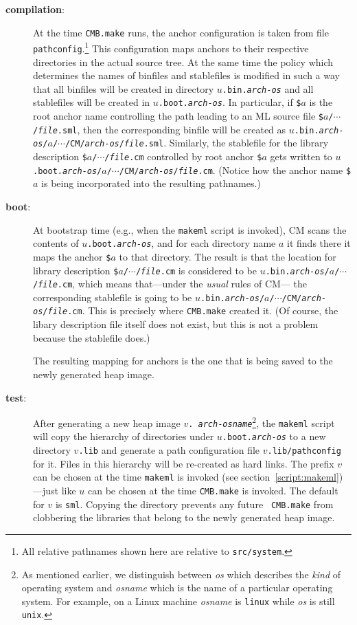\begin{description}
\item[{\bf compilation}:]
At the time {\tt CMB.make} runs, the anchor configuration is taken
from file {\tt pathconfig}.\footnote{All relative pathnames shown here
are relative to {\tt src/system}.}  This configuration maps anchors to
their respective directories in the actual source tree.  At the same
time the policy which determines the names of binfiles
and stablefiles is modified in such a way that all binfiles will be
created in directory {\tt $u$.bin.{\it arch}-{\it os}} and all
stablefiles will be created in {\tt $u$.boot.{\it arch}-{\it os}}.
In particular, if {\tt \$$a$} is the root anchor name controlling
the path leading to an ML source file
{\tt \$$a$/$\cdots$/{\it file}.sml},
then the corresponding binfile will be created as
{\tt $u$.bin.{\it arch}-{\it os}/$a$/$\cdots$/CM/{\it arch}-{\it os}/{\it file}.sml}.
Similarly, the stablefile for the library description
{\tt \$$a$/$\cdots$/{\it file}.cm} controlled by root anchor {\tt \$$a$}
gets written to
{\tt $u$.boot.{\it arch}-{\it os}/$a$/$\cdots$/CM/{\it arch}-{\it os}/{\it file}.cm}.
(Notice how the anchor name {\tt \$$a$} is being incorporated into the
resulting pathnames.)
\item[{\bf boot}:]
At bootstrap time (e.g., when the {\tt makeml} script is invoked), CM
scans the contents of {\tt $u$.boot.{\it arch}-{\it os}}, and for
each directory name $a$ it finds there it maps the anchor {\tt \$$a$} to that
directory.  The result is that the location for library description
{\tt \$$a$/$\cdots$/{\it file}.cm}
is considered to be
{\tt $u$.bin.{\it arch}-{\it os}/$a$/$\cdots$/{\it file}.cm}, which
means that---under the {\em usual} rules of CM---
the corresponding stablefile is going to be
{\tt $u$.bin.{\it arch}-{\it os}/$a$/$\cdots$/CM/{\it arch}-{\it
os}/{\it file}.cm}.  This is precisely where {\tt CMB.make} created
it.  (Of course, the libary description file itself does not exist,
but this is not a problem because the stablefile does.)

The resulting mapping for anchors is the one that is being saved to the
newly generated heap image.
\item[{\bf test}:] After generating a new heap image {\tt $v$.{\it
arch}-{\it osname}}\footnote{As mentioned earlier, we distinguish
between {\it os} which describes the {\em kind} of operating system
and {\it osname} which is the name of a particular operating system.
For example, on a Linux machine {\it osname} is {\tt linux} while {\it
os} is still {\tt unix}.}, the {\tt makeml} script will copy the
hierarchy of directories under {\tt $u$.boot.{\it arch}-{\it os}} to a
new directory {\tt $v$.lib} and generate a path configuration file
{\tt $v$.lib/pathconfig} for it.  Files in this hierarchy will be
re-created as hard links.  The prefix $v$ can be chosen at the time
{\tt makeml} is invoked (see section~\ref{script:makeml})---just like
$u$ can be chosen at the time {\tt CMB.make} is invoked.  The default
for $v$ is {\tt sml}.  Copying the directory prevents any future {\tt
CMB.make} from clobbering the libraries that belong to the newly
generated heap image.


\end{description}
